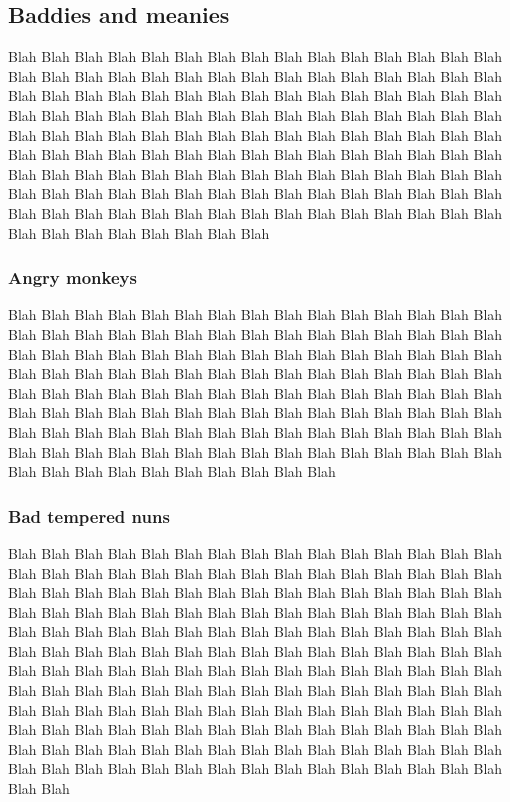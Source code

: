 \subsection{Baddies and meanies}
Blah Blah Blah Blah Blah Blah Blah Blah Blah Blah Blah Blah Blah
Blah Blah Blah Blah Blah Blah Blah Blah Blah Blah Blah Blah Blah
Blah Blah Blah Blah Blah Blah Blah Blah Blah Blah Blah Blah Blah
Blah Blah Blah Blah Blah Blah Blah Blah Blah Blah Blah Blah Blah
Blah Blah Blah Blah Blah Blah Blah Blah Blah Blah Blah Blah Blah
Blah Blah Blah Blah Blah Blah Blah Blah Blah Blah Blah Blah Blah
Blah Blah Blah Blah Blah Blah Blah Blah Blah Blah Blah Blah Blah
Blah Blah Blah Blah Blah Blah Blah Blah Blah Blah Blah Blah Blah
Blah Blah Blah Blah Blah Blah Blah Blah Blah Blah Blah Blah Blah
Blah Blah Blah Blah Blah Blah Blah Blah Blah Blah Blah Blah Blah
Blah Blah Blah Blah Blah Blah Blah Blah Blah Blah Blah Blah Blah

\subsubsection{Angry monkeys}
Blah Blah Blah Blah Blah Blah Blah Blah Blah Blah Blah Blah Blah
Blah Blah Blah Blah Blah Blah Blah Blah Blah Blah Blah Blah Blah
Blah Blah Blah Blah Blah Blah Blah Blah Blah Blah Blah Blah Blah
Blah Blah Blah Blah Blah Blah Blah Blah Blah Blah Blah Blah Blah
Blah Blah Blah Blah Blah Blah Blah Blah Blah Blah Blah Blah Blah
Blah Blah Blah Blah Blah Blah Blah Blah Blah Blah Blah Blah Blah
Blah Blah Blah Blah Blah Blah Blah Blah Blah Blah Blah Blah Blah
Blah Blah Blah Blah Blah Blah Blah Blah Blah Blah Blah Blah Blah
Blah Blah Blah Blah Blah Blah Blah Blah Blah Blah Blah Blah Blah
Blah Blah Blah Blah Blah Blah Blah Blah Blah Blah Blah Blah Blah

\subsubsection{Bad tempered nuns}
Blah Blah Blah Blah Blah Blah Blah Blah Blah Blah Blah Blah Blah
Blah Blah Blah Blah Blah Blah Blah Blah Blah Blah Blah Blah Blah
Blah Blah Blah Blah Blah Blah Blah Blah Blah Blah Blah Blah Blah
Blah Blah Blah Blah Blah Blah Blah Blah Blah Blah Blah Blah Blah
Blah Blah Blah Blah Blah Blah Blah Blah Blah Blah Blah Blah Blah
Blah Blah Blah Blah Blah Blah Blah Blah Blah Blah Blah Blah Blah
Blah Blah Blah Blah Blah Blah Blah Blah Blah Blah Blah Blah Blah
Blah Blah Blah Blah Blah Blah Blah Blah Blah Blah Blah Blah Blah
Blah Blah Blah Blah Blah Blah Blah Blah Blah Blah Blah Blah Blah
Blah Blah Blah Blah Blah Blah Blah Blah Blah Blah Blah Blah Blah
Blah Blah Blah Blah Blah Blah Blah Blah Blah Blah Blah Blah Blah
Blah Blah Blah Blah Blah Blah Blah Blah Blah Blah Blah Blah Blah
Blah Blah Blah Blah Blah Blah Blah Blah Blah Blah Blah Blah Blah
Blah Blah Blah Blah Blah Blah Blah Blah Blah Blah Blah Blah Blah
